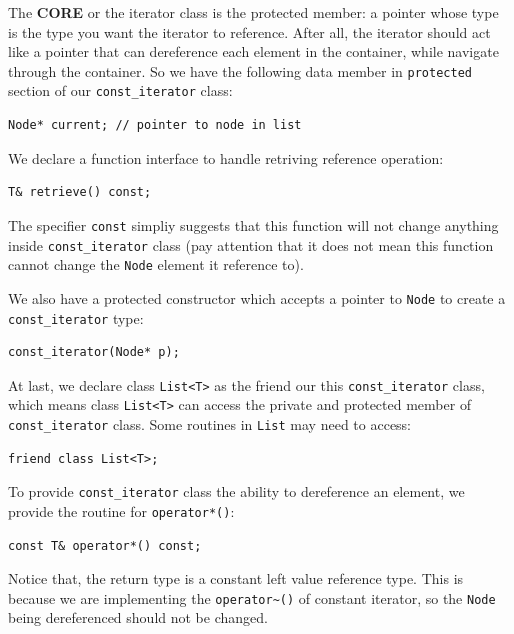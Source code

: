 \documentclass[12pt]{book}
\begin{document}
The \textbf{CORE} or the iterator class is the protected member: a pointer whose type is the type you want the iterator to reference. After all, the iterator should act like a pointer that can dereference each element in the container, while navigate through the container. So we have the following data member in \texttt{protected} section of our \texttt{const\_iterator} class:
\begin{verbatim}
Node* current; // pointer to node in list 
\end{verbatim}

We declare a function interface to handle retriving reference operation:
\begin{verbatim}
T& retrieve() const;
\end{verbatim}

The specifier \texttt{const} simpliy suggests that this function will not change anything inside \texttt{const\_iterator} class (pay attention that it does not mean this function cannot change the \texttt{Node} element it reference to).

We also have a protected constructor which accepts a pointer to \texttt{Node} to create a \texttt{const\_iterator} type:
\begin{verbatim}
const_iterator(Node* p);
\end{verbatim}

At last, we declare class \texttt{List<T>} as the friend our this \texttt{const\_iterator} class, which means class \texttt{List<T>} can access the private and protected member of \texttt{const\_iterator} class. Some routines in \texttt{List} may need to access:
\begin{verbatim}
friend class List<T>;
\end{verbatim}

To provide \texttt{const\_iterator} class the ability to dereference an element, we provide the routine for \texttt{operator*()}:
\begin{verbatim}
const T& operator*() const;
\end{verbatim}
Notice that, the return type is a constant left value reference type. This is because we are implementing the \texttt{operator\textasciitilde{}()} of constant iterator, so the \texttt{Node} being dereferenced should not be changed.
\end{document}
